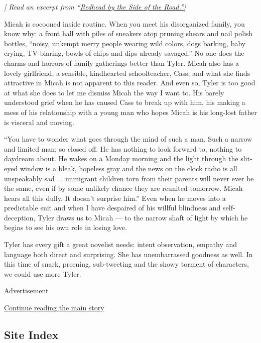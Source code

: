 \emph{{[} Read an excerpt from
``}\href{https://www.nytimes3xbfgragh.onion/2020/04/07/books/review/redhead-by-the-side-of-the-road-by-anne-tyler-an-excerpt.html}{\emph{Redhead
by the Side of the Road.''}}\emph{{]}}

Micah is cocooned inside routine. When you meet his disorganized family,
you know why: a front hall with piles of sneakers atop pruning shears
and nail polish bottles, ``noisy, unkempt merry people wearing wild
colors, dogs barking, baby crying, TV blaring, bowls of chips and dips
already savaged.'' No one does the charms and horrors of family
gatherings better than Tyler. Micah also has a lovely girlfriend, a
sensible, kindhearted schoolteacher, Cass, and what she finds attractive
in Micah is not apparent to this reader. And even so, Tyler is too good
at what she does to let me dismiss Micah the way I want to. His barely
understood grief when he has caused Cass to break up with him, his
making a mess of his relationship with a young man who hopes Micah is
his long-lost father is visceral and moving.

``You have to wonder what goes through the mind of such a man. Such a
narrow and limited man; so closed off. He has nothing to look forward
to, nothing to daydream about. He wakes on a Monday morning and the
light through the slit-eyed window is a bleak, hopeless gray and the
news on the clock radio is all unspeakably sad ... immigrant children
torn from their parents will never ever be the same, even if by some
unlikely chance they are reunited tomorrow. Micah hears all this dully.
It doesn't surprise him.'' Even when he moves into a predictable snit
and when I have despaired of his willful blindness and self-deception,
Tyler draws us to Micah --- to the narrow shaft of light by which he
begins to see his own role in losing love.

Tyler has every gift a great novelist needs: intent observation, empathy
and language both direct and surprising. She has unembarrassed goodness
as well. In this time of snark, preening, sub-tweeting and the showy
torment of characters, we could use more Tyler.

Advertisement

\protect\hyperlink{after-bottom}{Continue reading the main story}

\hypertarget{site-index}{%
\subsection{Site Index}\label{site-index}}

